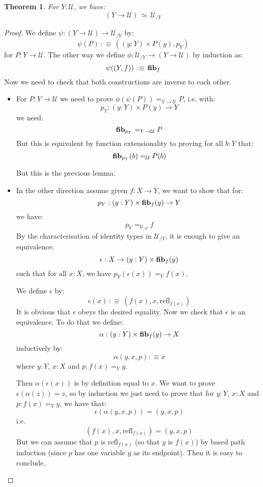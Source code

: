 \documentclass{article}
\newcommand{\U}{{\mathcal U}}
\renewcommand{\r}{\rightarrow}
\newcommand{\refl}{\mathrm{refl}}
\newcommand{\fib}{\mathrm{\bf fib}}
\newtheorem{theorem}{Theorem}
\begin{document}
\begin{theorem}
For $Y:\U$, we have:
\[(Y\r \U) \, \simeq\, \U_{/Y}\]
\end{theorem}


\begin{proof}
We define $\psi : (Y\r \U)\r \U_{/Y}$ by:
\[\psi(P) \, :\equiv \, ((y:Y)\times P(y) , p_Y)\]
for $P:Y\r \U$. The other way we define $\phi : \U_{/Y}\r (Y\r \U)$ by induction as:
\[\psi((Y,f)) \, :\equiv \, \fib_f\]
Now we need to check that both constructions are inverse to each other.
\begin{itemize}
\item  For $P:Y\r \U$ we need to prove $\phi(\psi(P)) =_{Y\r \U} P$, i.e. with: 
\[p_Y : (y:Y)\times P(y)\r Y\]
we need:
\[\fib_{p_Y} =_{Y\r \U} P\]
But this is equivalent by function extensionality to proving for all $b:Y$ that:
\[\fib_{p_Y}(b) =_\U P(b) \]

But this is the previous lemma.

\item In the other direction assume given $f:X\r Y$, we want to show that for: 
\[p_Y : (y:Y)\times \fib_f(y) \r Y\]
we have:
\[p_Y=_{\U_{/Y}} f\]
By the characterisation of identity types in $\U_{/Y}$, it is enough to give an equivalence:
\[\epsilon : X\r (y:Y)\times \fib_f(y)  \]
such that for all $x:X$, we have $p_Y(\epsilon(x)) =_Y f(x)$.

We define $\epsilon$ by:
\[\epsilon(x) \, :\equiv\, (f(x),x,\refl_{f(x)})\]
It is obvious that $\epsilon$ obeys the desired equality. Now we check that $\epsilon$ is an equivalence. To do that we define: 
\[\alpha : (y:Y)\times \fib_f(y) \r X\] 
inductively by: 
\[\alpha(y,x,p) :\equiv x\]
where $y:Y$, $x:X$ and $p:f(x)=_Y y$.

Then $\alpha(\epsilon(x))$ is by definition equal to $x$. We want to prove $\epsilon(\alpha(z)) = z$, so by induction we just need to prove that for $y:Y$, $x:X$ and $p:f(x)=_Y y$, we have that:
\[\epsilon(\alpha(y,x,p)) = (y,x,p)\]
i.e. 
\[(f(x),x,\refl_{f(x)}) = (y,x,p)\]
But we can assume that $p$ is $\refl_{f(x)}$ (so that $y$ is $f(x)$) by based path induction (since $p$ has one variable $y$ as its endpoint). Then it is easy to conclude.%

\end{itemize}
\end{proof}
\end{document}
